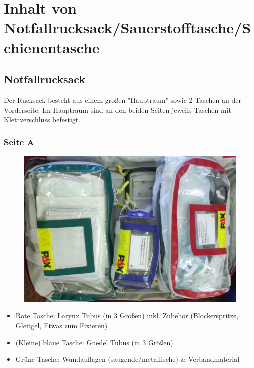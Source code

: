 \chapter{Inhalt von Notfallrucksack/Sauerstofftasche/Schienentasche}
\section{Notfallrucksack}
Der Rucksack besteht aus einem großen "Hauptraum" sowie 2 Taschen an der Vorderseite.
Im Hauptraum sind an den beiden Seiten jeweils Taschen mit Klettverschluss befestigt.
\subsection*{Seite A}
\begin{figure}[H]
    \centering
    \includegraphics[width=\textwidth]{res/rucksack_a.png}
\end{figure}
\begin{itemize}
    \item Rote Tasche: Larynx Tubus (in 3 Größen) inkl. Zubehör (Blockerspritze, Gleitgel, Etwas zum Fixieren)
    \item (Kleine) blaue Tasche: Guedel Tubus (in 3 Größen)
    \item Grüne Tasche: Wundauflagen (saugende/metallische) \& Verbandmaterial
\end{itemize}
